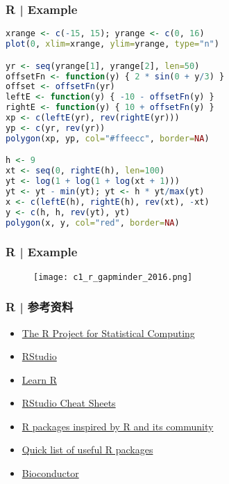\begin{frame}[fragile]
  \frametitle{R | Example}
  \vspace{-1.5em}
\begin{lstlisting}[language=R,basicstyle=\footnotesize\tt]
xrange <- c(-15, 15); yrange <- c(0, 16)
plot(0, xlim=xrange, ylim=yrange, type="n")

yr <- seq(yrange[1], yrange[2], len=50)
offsetFn <- function(y) { 2 * sin(0 + y/3) }
offset <- offsetFn(yr)
leftE <- function(y) { -10 - offsetFn(y) }
rightE <- function(y) { 10 + offsetFn(y) }
xp <- c(leftE(yr), rev(rightE(yr)))
yp <- c(yr, rev(yr))
polygon(xp, yp, col="#ffeecc", border=NA)

h <- 9
xt <- seq(0, rightE(h), len=100)
yt <- log(1 + log(1 + log(xt + 1)))
yt <- yt - min(yt); yt <- h * yt/max(yt)
x <- c(leftE(h), rightE(h), rev(xt), -xt)
y <- c(h, h, rev(yt), yt)
polygon(x, y, col="red", border=NA)
\end{lstlisting}
\end{frame}

\begin{frame}
  \frametitle{R | Example}
  \begin{figure}
    \centering
    \texttt{[image: c1\_r\_gapminder\_2016.png]}
  \end{figure}
\end{frame}

\begin{frame}
  \frametitle{R | 参考资料}
   \begin{itemize}
     \item \href{https://www.r-project.org/}{The R Project for Statistical Computing}
     \item \href{https://www.rstudio.com/}{RStudio}
     \item \href{https://support.rstudio.com/hc/en-us/categories/200098757-Learn-R}{Learn R}
     \item \href{https://www.rstudio.com/resources/cheatsheets/}{RStudio Cheat Sheets}
     \item \href{https://www.rstudio.com/products/rpackages/}{R packages inspired by R and its community}
     \item \href{https://support.rstudio.com/hc/en-us/articles/201057987-Quick-list-of-useful-R-packages}{Quick list of useful R packages}
     \item \href{https://www.bioconductor.org/}{Bioconductor}
   \end{itemize}
\end{frame}

